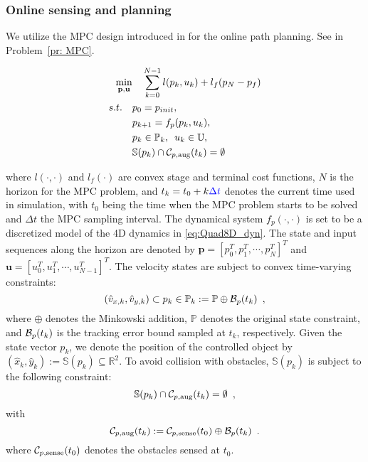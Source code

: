 \subsubsection{Online sensing and planning}
%
We utilize the MPC design introduced in \cite{Zhang2017} for the online path planning. See in Problem~\ref{pr: MPC}.
%
\begin{problem}\label{pr: MPC}
\begin{align*}
\min_{\mathbf{p},\mathbf{u}}  & \quad \sum^{N-1}_{k=0} l(p_k,u_k) + l_f(p_N-p_f)  \\
s.t. \quad & p_0 = p_{init},\\
&p_{k+1} = f_p(p_k,u_k),\\
& p_k \in \mathbb{P}_k ,\enspace u_k \in \mathbb{U},\\
& \mathbb{S}(p_k)\cap\mathcal C_{p,\text{aug}}(t_k) = \emptyset
\end{align*}
\end{problem}
where $l(\cdot,\cdot)$ and $l_f(\cdot)$ are convex stage and terminal cost functions, $N$ is the horizon for the MPC problem, and $t_k = t_0 + k \textcolor{blue}{\Delta t}$ denotes the current time used in simulation, with $t_0$ being the time when the MPC problem starts to be solved and $\Delta t$ the MPC sampling interval. The dynamical system $f_p(\cdot,\cdot)$ is set to be a discretized model of the 4D dynamics in \eqref{eq:Quad8D_dyn}. The state and input sequences along the horizon  are denoted by $\mathbf{p}=[p^{T}_0,p^{T}_1,\cdots,p^{T}_N]^{T}$ and $\mathbf{u}=[u^{T}_0,u^{T}_1,\cdots,u^{T}_{N-1}]^{T}$. The velocity states are subject to convex time-varying constraints:
%
\begin{equation}
(\hat v_{x,k},\hat v_{y,k}) \subset p_k \in \mathbb{P}_k :=\mathbb{P}\oplus\mathcal B_p(t_k) \enspace ,
\end{equation}
%
where $\oplus$ denotes the Minkowski addition, $\mathbb{P}$ denotes the original state constraint, and $\mathcal B_p(t_k)$ is the tracking error bound sampled at $t_k$, respectively. Given the state vector $p_k$, we denote the position of the controlled object by $(\hat x_k,\hat y_k) := \mathbb{S}(p_k)\subseteq \mathbb{R}^{2}$. To avoid collision with obstacles, $\mathbb{S}(p_k)$ is subject to the following constraint: 
%
\begin{equation}
\mathbb{S}(p_k)\cap\mathcal C_{p,\text{aug}}(t_k) = \emptyset \enspace ,
\end{equation}
%
with 
%
\begin{equation}
\mathcal C_{p,\text{aug}}(t_k) := \mathcal C_{p,\text{sense}}(t_0)\oplus\mathcal B_p(t_k) \enspace .
\end{equation}
%
where $\mathcal C_{p,\text{sense}}(t_0)$ denotes the obstacles sensed at $t_0$.

